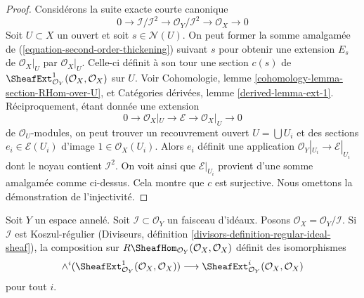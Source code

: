 \begin{proof}
Considérons la suite exacte courte canonique
\begin{equation}
\label{equation-second-order-thickening}
0 \to \mathcal{I}/\mathcal{I}^2 \to \mathcal{O}_Y/\mathcal{I}^2 \to
\mathcal{O}_X \to 0
\end{equation}
Soit $U \subset X$ un ouvert et soit $s \in \mathcal{N}(U)$. On peut former la somme amalgamée de (\ref{equation-second-order-thickening}) suivant $s$ pour obtenir une extension $E_s$ de $\mathcal{O}_X|_U$ par $\mathcal{O}_X|_U$. Celle-ci définit à son tour une section $c(s)$ de
$\SheafExt^1_{\mathcal{O}_Y}(\mathcal{O}_X, \mathcal{O}_X)$
sur $U$. Voir Cohomologie, lemme \ref{cohomology-lemma-section-RHom-over-U}, et Catégories dérivées, lemme \ref{derived-lemma-ext-1}. Réciproquement, étant donnée une extension
$$
0 \to \mathcal{O}_X|_U \to \mathcal{E} \to \mathcal{O}_X|_U \to 0
$$
de $\mathcal{O}_U$-modules, on peut trouver un recouvrement ouvert $U = \bigcup U_i$ et des sections $e_i \in \mathcal{E}(U_i)$ d'image $1 \in \mathcal{O}_X(U_i)$. Alors $e_i$ définit une application $\mathcal{O}_Y|_{U_i} \to \mathcal{E}|_{U_i}$ dont le noyau contient $\mathcal{I}^2$. On voit ainsi que $\mathcal{E}|_{U_i}$ provient d'une somme amalgamée comme ci-dessus. Cela montre que $c$ est surjective. Nous omettons la démonstration de l'injectivité.
\end{proof}

\begin{lemma}
\label{lemma-regular-ideal-ext}
Soit $Y$ un espace annelé. Soit $\mathcal{I} \subset \mathcal{O}_Y$ un faisceau d'idéaux. Posons $\mathcal{O}_X = \mathcal{O}_Y/\mathcal{I}$. Si $\mathcal{I}$ est Koszul-régulier (Diviseurs, définition \ref{divisors-definition-regular-ideal-sheaf}), la composition sur $R\SheafHom_{\mathcal{O}_Y}(\mathcal{O}_X, \mathcal{O}_X)$ définit des isomorphismes
$$
\wedge^i(\SheafExt^1_{\mathcal{O}_Y}(\mathcal{O}_X, \mathcal{O}_X))
\longrightarrow
\SheafExt^i_{\mathcal{O}_Y}(\mathcal{O}_X, \mathcal{O}_X)
$$
pour tout $i$.
\end{lemma}

